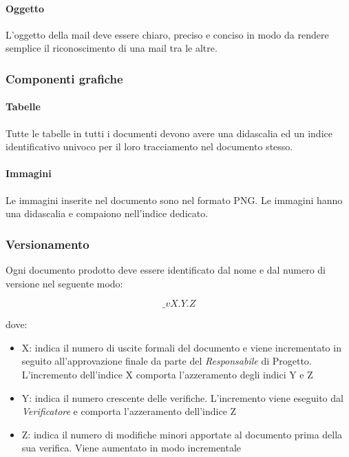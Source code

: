 \paragraph{Oggetto}

L'oggetto della mail deve essere chiaro, preciso e conciso in modo da rendere semplice il riconoscimento di una mail tra le altre.


\subsubsection{Componenti grafiche}

\paragraph{Tabelle }

Tutte le tabelle in tutti i documenti devono avere una didascalia ed
un indice identificativo univoco per il loro tracciamento nel
documento stesso. 

\paragraph{Immagini }

Le immagini inserite nel documento sono nel formato PNG. Le immagini hanno una didascalia e compaiono nell'indice dedicato.

\subsubsection{Versionamento}

Ogni documento prodotto deve essere identificato dal nome e dal numero di versione nel seguente modo:

$$ \_vX.Y.Z $$



dove:
\begin{itemize}
\item  X: indica il numero di uscite formali del documento e viene incrementato in seguito all'approvazione finale da parte del  \emph{Responsabile}  di Progetto.
L'incremento dell'indice X comporta l'azzeramento degli indici Y e Z

\item  Y: indica il numero crescente delle verifiche. L'incremento viene eseguito dal  \emph{Verificatore}  e comporta l'azzeramento dell'indice Z

\item  Z: indica il numero di modifiche minori apportate al documento prima della sua verifica. Viene aumentato in modo incrementale
\end{itemize}

